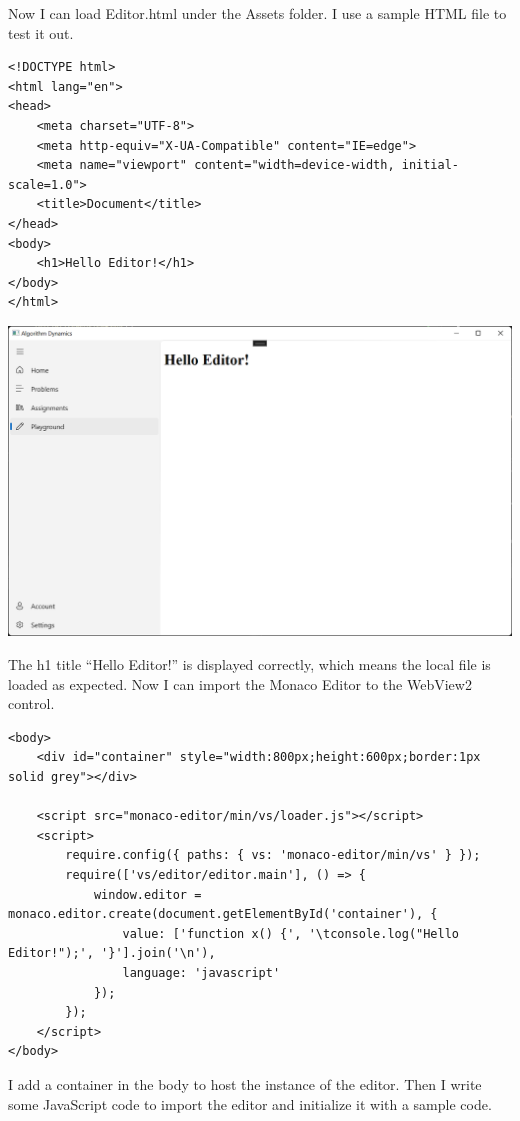 \documentclass[a4paper]{report}
\begin{document}
Now I can load Editor.html under the Assets folder. I use a sample HTML file to test it out.

\begin{verbatim}
<!DOCTYPE html>
<html lang="en">
<head>
    <meta charset="UTF-8">
    <meta http-equiv="X-UA-Compatible" content="IE=edge">
    <meta name="viewport" content="width=device-width, initial-scale=1.0">
    <title>Document</title>
</head>
<body>
    <h1>Hello Editor!</h1>
</body>
</html>
\end{verbatim}

\includegraphics[width=\textwidth, height=\textheight, keepaspectratio]{PlaygroundPage-WebView2-HelloEditor}

The h1 title ``Hello Editor!'' is displayed correctly, which means the local file is loaded as expected. Now I can import the Monaco Editor to the WebView2 control.

\begin{verbatim}
<body>
    <div id="container" style="width:800px;height:600px;border:1px solid grey"></div>

    <script src="monaco-editor/min/vs/loader.js"></script>
    <script>
        require.config({ paths: { vs: 'monaco-editor/min/vs' } });
        require(['vs/editor/editor.main'], () => {
            window.editor = monaco.editor.create(document.getElementById('container'), {
                value: ['function x() {', '\tconsole.log("Hello Editor!");', '}'].join('\n'),
                language: 'javascript'
            });
        });
    </script>
</body>
\end{verbatim}

I add a container in the body to host the instance of the editor. Then I write some JavaScript code to import the editor and initialize it with a sample code.
\end{document}
